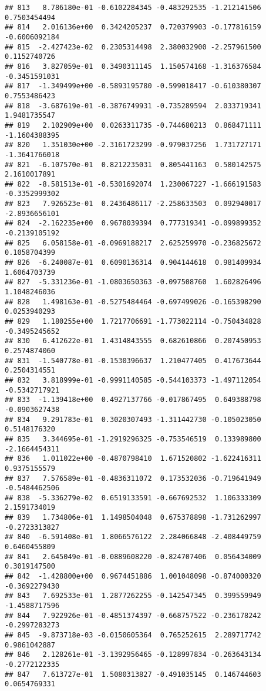 \documentclass[
]{article}
\begin{document}
\begin{verbatim}
## 813   8.786180e-01 -0.6102284345 -0.483292535 -1.212141506  0.7503454494
## 814   2.016136e+00  0.3424205237  0.720379903 -0.177816159 -0.6006092184
## 815  -2.427423e-02  0.2305314498  2.380032900 -2.257961500  0.1152740726
## 816   3.827059e-01  0.3490311145  1.150574168 -1.316376584 -0.3451591031
## 817  -1.349499e+00 -0.5893195780 -0.599018417 -0.610380307  0.7553486423
## 818  -3.687619e-01 -0.3876749931 -0.735289594  2.033719341  1.9481735547
## 819   2.102909e+00  0.0263311735 -0.744680213  0.868471111 -1.1604388395
## 820   1.351030e+00 -2.3161723299 -0.979037256  1.731727171 -1.3641766018
## 821  -6.107570e-01  0.8212235031  0.805441163  0.580142575  2.1610017891
## 822  -8.581513e-01 -0.5301692074  1.230067227 -1.666191583 -0.3352999302
## 823   7.926523e-01  0.2436486117 -2.258633503  0.092940017 -2.8936656101
## 824  -2.162235e+00  0.9678039394  0.777319341 -0.099899352 -0.2139105192
## 825   6.058158e-01 -0.0969188217  2.625259970 -0.236825672  0.1058704399
## 826  -6.240087e-01  0.6090136314  0.904144618  0.981409934  1.6064703739
## 827  -5.331236e-01 -1.0803650363 -0.097508760  1.602826496  1.1048246036
## 828   1.498163e-01 -0.5275484464 -0.697499026 -0.165398290  0.0253940293
## 829   1.180255e+00  1.7217706691 -1.773022114 -0.750434828 -0.3495245652
## 830   6.412622e-01  1.4314843555  0.682610866  0.207450953  0.2574874060
## 831  -1.540778e-01 -0.1530396637  1.210477405  0.417673644  0.2504314551
## 832   3.818999e-01 -0.9991140585 -0.544103373 -1.497112054 -0.5342717921
## 833  -1.139418e+00  0.4927137766 -0.017867495  0.649388798 -0.0903627438
## 834   9.291783e-01  0.3020307493 -1.311442730 -0.105023050  0.5148176320
## 835   3.344695e-01 -1.2919296325 -0.753546519  0.133989800 -2.1664454311
## 836   1.011022e+00 -0.4870798410  1.671520802 -1.622416311  0.9375155579
## 837   7.576589e-01 -0.4836311072  0.173532036 -0.719641949 -0.5484462506
## 838  -5.336279e-02  0.6519133591 -0.667692532  1.106333309  2.1591734019
## 839   1.734806e-01  1.1498504048  0.675378898 -1.731262997 -0.2723313827
## 840  -6.591408e-01  1.8066576122  2.284066848 -2.408449759  0.6460455809
## 841   2.645049e-01 -0.0889608220 -0.824707406  0.056434009  0.3019147500
## 842  -1.428800e+00  0.9674451886  1.001048098 -0.874000320 -0.3692279430
## 843   7.692533e-01  1.2877262255 -0.142547345  0.399559949 -1.4588717596
## 844   7.922926e-01 -0.4851374397 -0.668757522 -0.236178242 -0.2997283273
## 845  -9.873718e-03 -0.0150605364  0.765252615  2.289717742  0.9861042887
## 846   2.128261e-01 -3.1392956465 -0.128997834 -0.263643134 -0.2772122335
## 847   7.613727e-01  1.5080313827 -0.491035145  0.146744603  0.0654769331

\end{verbatim}
\end{document}
